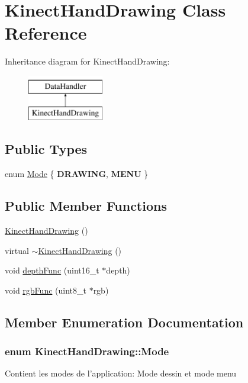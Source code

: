 \hypertarget{classKinectHandDrawing}{
\section{\-Kinect\-Hand\-Drawing \-Class \-Reference}
\label{classKinectHandDrawing}
}
\-Inheritance diagram for \-Kinect\-Hand\-Drawing\-:\begin{figure}[H]
\begin{center}
\leavevmode
\includegraphics[height=2.000000cm]{classKinectHandDrawing}
\end{center}
\end{figure}
\subsection*{\-Public \-Types}
\begin{DoxyCompactItemize}
\item 
enum \hyperlink{classKinectHandDrawing_a69d3e7204e09178744b010351a4bbcc4}{\-Mode} \{ {\bfseries \-D\-R\-A\-W\-I\-N\-G}, 
{\bfseries \-M\-E\-N\-U}
 \}
\end{DoxyCompactItemize}
\subsection*{\-Public \-Member \-Functions}
\begin{DoxyCompactItemize}
\item 
\hyperlink{classKinectHandDrawing_a69504c70ec66e9aa7365c502dbc74b02}{\-Kinect\-Hand\-Drawing} ()
\item 
virtual \hyperlink{classKinectHandDrawing_a396630a27a66c9b19e746ebd6377ddd2}{$\sim$\-Kinect\-Hand\-Drawing} ()
\item 
void \hyperlink{classKinectHandDrawing_ae6aaaacae1904f8d12af96c1702b9912}{depth\-Func} (uint16\-\_\-t $\ast$depth)
\item 
void \hyperlink{classKinectHandDrawing_af6f143e88378b3706c52928dc18ae52f}{rgb\-Func} (uint8\-\_\-t $\ast$rgb)
\end{DoxyCompactItemize}


\subsection{\-Member \-Enumeration \-Documentation}
\hypertarget{classKinectHandDrawing_a69d3e7204e09178744b010351a4bbcc4}{
\subsubsection[{\-Mode}]{\setlength{\rightskip}{0pt plus 5cm}enum {\bf \-Kinect\-Hand\-Drawing\-::\-Mode}}}
\label{classKinectHandDrawing_a69d3e7204e09178744b010351a4bbcc4}
\-Contient les modes de l'application\-: \-Mode dessin et mode menu 

